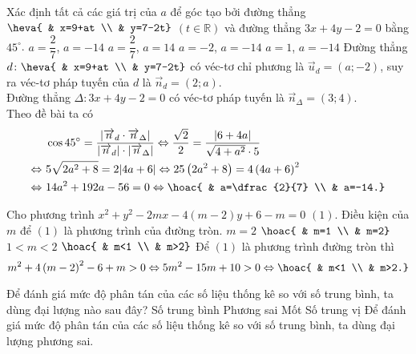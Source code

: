 \begin{ex}%
Xác định tất cả các giá trị của $a$ để góc tạo bởi đường thẳng $\heva{ & x=9+at \\ & y=7-2t}$ $(t\in\mathbb{R})$ và đường thẳng $3x+4y-2=0$ bằng $45^{\circ}$.
\choice
{\True $a=\dfrac{2}{7}$, $a=-14$}
{$a=\dfrac{2}{7}$, $a=14$}
{$a=-2$, $a=-14$}
{$a=1$, $a=-14$}
\loigiai
{
Đường thẳng $d\colon \heva{ & x=9+at \\ & y=7-2t}$ có véc-tơ chỉ phương là $\overrightarrow{u}_{d}=(a;-2)$, suy ra véc-tơ pháp tuyến của $d$ là $\overrightarrow{n}_{d}=(2;a)$. \\
Đường thẳng $\Delta\colon 3x+4y-2=0$ có véc-tơ pháp tuyến là $\overrightarrow{n}_{\Delta}=(3;4)$. \\
Theo đề bài ta có
$$\begin{aligned}
& \ \cos 45^{\circ}=\dfrac{\left|\overrightarrow{n}_{d}\cdot\overrightarrow{n}_{\Delta}\right|}{\left|\overrightarrow{n}_{d}\right|\cdot\left|\overrightarrow{n}_{\Delta}\right|} \Leftrightarrow \dfrac{\sqrt{2}}{2}=\dfrac{|6+4a|}{\sqrt{4+a^2}\cdot5} \\
\Leftrightarrow & \ 5\sqrt{2a^2+8}=2|4a+6| \Leftrightarrow 25\left(2a^2+8\right)=4\left(4a+6\right)^2 \\
\Leftrightarrow & \ 14a^2+192a-56=0 \Leftrightarrow \hoac{ & a=\dfrac{2}{7} \\ & a=-14.}
\end{aligned}$$
}
\end{ex}

\begin{ex}%
Cho phương trình $x^2+y^2-2mx-4(m-2)y+6-m=0$ $(1)$. Điều kiện của $m$ để $(1)$ là phương trình của đường tròn.
\choice
{$m=2$}
{$\hoac{ & m=1 \\ & m=2}$}
{$1<m<2$}
{\True $\hoac{ & m<1 \\ & m>2}$}
\loigiai
{
Để $(1)$ là phương trình đường tròn thì
$$m^2+4\left(m-2\right)^2-6+m>0 \Leftrightarrow 5m^2-15m+10>0 \Leftrightarrow \hoac{ & m<1 \\ & m>2.}$$
}
\end{ex}

\begin{ex}%
Để đánh giá mức độ phân tán của các số liệu thống kê so với số trung bình, ta dùng đại lượng nào sau đây?
\choice
{Số trung bình}
{\True Phương sai}
{Mốt}
{Số trung vị}
\loigiai
{
Để đánh giá mức độ phân tán của các số liệu thống kê so với số trung bình, ta dùng đại lượng phương sai.
}
\end{ex}

